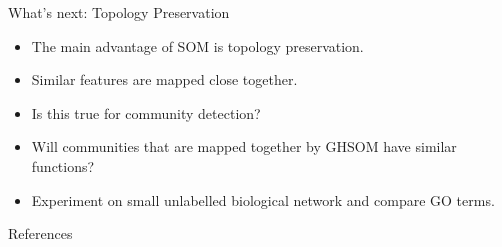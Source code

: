 \documentclass{beamer}
\begin{document}
	\begin{frame}{What's next: Topology Preservation}
	\begin{itemize}
	\item The main advantage of SOM is topology preservation. 
	\item Similar features are mapped close together.
	\item Is this true for community detection?
	\item Will communities that are mapped together by GHSOM have similar functions?
	\item Experiment on small unlabelled biological network and compare GO terms. 
	\end{itemize}
	\end{frame}
	
	\begin{frame}[allowframebreaks]{References}
		
		
	\end{frame}
	
\end{document}
